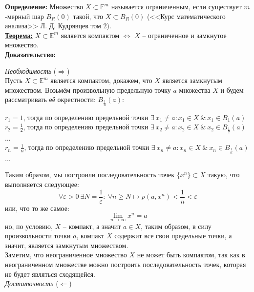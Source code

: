 \documentclass[a4paper,12pt]{article} %
\begin{document}
\underline{\textbf{Определение:}} Множество $X \subset \mathbb{E}^m$ называется ограниченным, если существует $m$-мерный шар $B_{R}(0)$ такой, что $X \subset B_{R}(0)$ (<<Курс математического анализа>> Л. Д. Кудрявцев том 2).\\

\underline{\textbf{Теорема:}} $X \subset \mathbb{E}^m$ является компактом $\Leftrightarrow$ $X$ -- ограниченное и замкнутое множество.\\

\textbf{Доказательство:}

\textit{Необходимость} ($\Rightarrow$)\\

Пусть $X \subset \mathbb{E}^m$ является компактом, докажем, что $X$ является замкнутым множеством. Возьмём произвольную предельную точку $a$ множества $X$ и будем рассматривать её окрестности: $B_{\frac{1}{n}}(a)$:
\begin{center}
    $r_1 = 1$, тогда по определению предельной точки $\exists ~ x_1 \neq a : x_1 \in X ~ \& ~ x_1 \in B_{1}(a)$\\
    $r_2 = \frac{1}{2}$, тогда по определению предельной точки $\exists ~ x_2 \neq a : x_2 \in X ~ \& ~ x_2 \in B_{\frac{1}{2}}(a)$\\
    $\dots$\\
    $r_n = \frac{1}{n}$, тогда по определению предельной точки $\exists ~ x_n \neq a : x_n \in X ~ \& ~ x_n \in B_{\frac{1}{n}}(a)$\\
    $\dots$\\
\end{center}

Таким образом, мы построили последовательность точек $\{x^n \} \subset X$ такую, что выполняется следующее:
\[ \forall \varepsilon > 0 ~ \exists N = \frac{1}{\varepsilon} : ~ \forall n \geqslant N \mapsto \rho(a, x^n) < \frac{1}{n} < \varepsilon \]
или, что то же самое:
\[\lim\limits_{n \to \infty} x^n = a \]
но, по условию, $X$ -- компакт, а значит $a \in X$, таким образом, в силу произвольности точки $a$, компакт $X$ содержит все свои предельные точки, а значит, является замкнутым множеством.\\

Заметим, что неограниченное множество $X$ не может быть компактом, так как в неограниченном множестве можно построить последовательность точек, которая не будет являться сходящейся.\\

\textit{Достаточность} ($\Leftarrow$)\\
\end{document}
